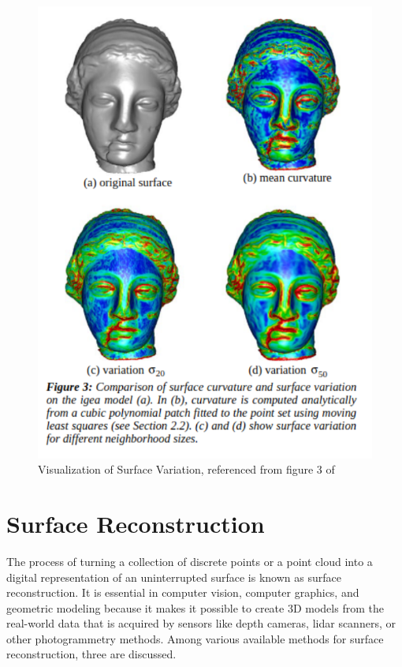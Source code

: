\begin{figure}[htbp]
    \centering
    \includegraphics[width=0.6\linewidth]{97_graphics/related_work/surf_variation_with_description.pdf}
    \caption{Visualization of Surface Variation, referenced from figure 3 of \parencite{pauly2002efficient}}
    \label{fig:related_work-surface_variation_visualize}
\end{figure}

\section{Surface Reconstruction}
The process of turning a collection of discrete points or a point cloud into a digital representation of an uninterrupted surface is known as surface reconstruction. It is essential in computer vision, computer graphics, and geometric modeling because it makes it possible to create 3D models from the real-world data that is acquired by sensors like depth cameras, lidar scanners, or other photogrammetry methods. Among various available methods for surface reconstruction, three are discussed.

